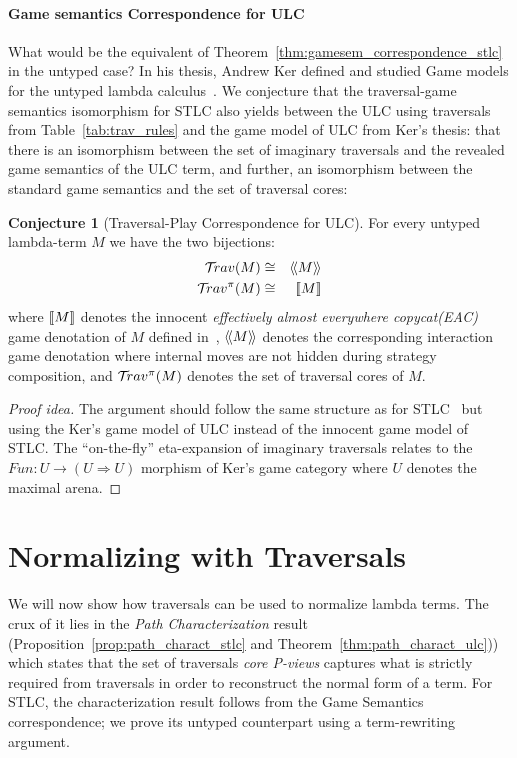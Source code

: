 \documentclass{article}
\theoremstyle{definition}
\newtheorem{conjecture}{Conjecture}[section]
\newcommand{\travulc}{\travset}
\def\coresymbol{\pi} %
\begin{document}
\paragraph{Game semantics Correspondence for ULC}
What would be the equivalent of Theorem~\ref{thm:gamesem_correspondence_stlc} in the untyped case? In his thesis, Andrew Ker defined and studied Game models for the untyped lambda calculus~\cite{KerThesis}.  We conjecture that the traversal-game semantics isomorphism for STLC also yields between the ULC using traversals from Table~\ref{tab:trav_rules} and the game model of ULC from Ker's thesis: that there is an isomorphism between the set of imaginary traversals and the revealed game semantics of the ULC term, and further, an isomorphism between the standard game semantics and the set of traversal cores:

\begin{conjecture}[Traversal-Play Correspondence for ULC]
\label{conj:ulc_corresp}
For every untyped lambda-term $M$ we have the two bijections:
\begin{eqnarray*}
 \travulc(M) &\cong& \revsem{M} \\
 \travulc^\coresymbol(M) &\cong& \sem{M}
\end{eqnarray*}
where ${[\![ M ]\!]}$ denotes the innocent \emph{effectively almost everywhere copycat(EAC)} game denotation of $M$ defined in~\cite{KerThesis},
${\langle\!\langle M \rangle\!\rangle}$ denotes the corresponding interaction game denotation where internal moves are not hidden during strategy composition,
and $\travulc^\coresymbol(M)$ denotes the set of traversal cores of $M$.
\end{conjecture}

\begin{proof}[Proof idea]
The argument should follow the same structure as for STLC~\cite{BlumPhd} but using the Ker's game model of ULC instead of the innocent game model of STLC. The ``on-the-fly'' eta-expansion of imaginary traversals relates to the $Fun : U \rightarrow (U \Rightarrow U)$ morphism of Ker's game category where $U$ denotes the maximal arena.
\end{proof}

\section{Normalizing with Traversals}

We will now show how traversals can be used to normalize lambda terms. The crux of it lies in the \emph{Path Characterization} result (Proposition~\ref{prop:path_charact_stlc} and Theorem~\ref{thm:path_charact_ulc})) which states that the set of traversals \emph{core P-views} captures what is strictly required from traversals in order to reconstruct the normal form of a term.
For STLC, the characterization result follows from the Game Semantics correspondence; we prove its untyped counterpart using a term-rewriting argument.
\end{document}
